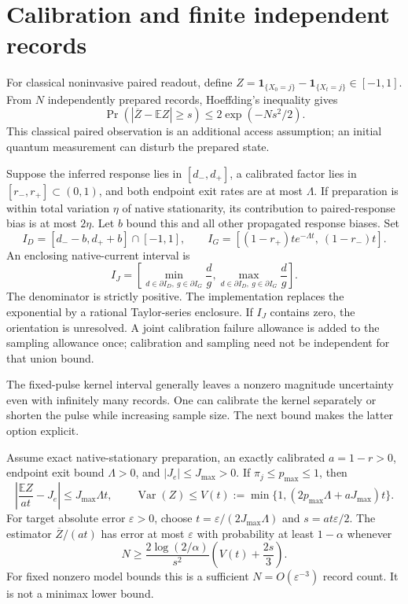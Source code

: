 \section{Calibration and finite independent records}

For classical noninvasive paired readout, define
$Z=\mathbf 1_{\{X_0=j\}}-\mathbf 1_{\{X_t=j\}}\in[-1,1]$.
From $N$ independently prepared records, Hoeffding's inequality gives
\[
 \Pr(|\overline Z-\mathbb EZ|\ge s)\le
           2\exp(-Ns^2/2).
\]
This classical paired observation is an additional access assumption;
an initial quantum measurement can disturb the prepared state.

Suppose the inferred response lies in $[d_-,d_+]$, a calibrated factor
lies in $[r_-,r_+]\subset(0,1)$, and both endpoint exit rates are at most
$\Lambda$.  If preparation is within total variation $\eta$ of native
stationarity, its contribution to paired-response bias is at most
$2\eta$.  Let $b$ bound this and all other propagated response biases.
Set
\[
 I_D=[d_--b,d_++b]\cap[-1,1],\qquad
 I_G=[(1-r_+)t e^{-\Lambda t},\ (1-r_-)t].
\]
An enclosing native-current interval is
\begin{equation}
 I_J=\left[
 \min_{d\in\partial I_D,\ g\in\partial I_G}\frac d g,
 \max_{d\in\partial I_D,\ g\in\partial I_G}\frac d g
 \right].\label{eq:physical-current-interval}
\end{equation}
The denominator is strictly positive.  The implementation replaces
the exponential by a rational Taylor-series enclosure.  If $I_J$
contains zero, the orientation is unresolved.  A joint calibration
failure allowance is added to the sampling allowance once; calibration
and sampling need not be independent for that union bound.

The fixed-pulse kernel interval generally leaves a nonzero magnitude
uncertainty even with infinitely many records.  One can calibrate the
kernel separately or shorten the pulse while increasing sample size.
The next bound makes the latter option explicit.

\begin{proposition}
\label{prop:physical-magnitude}
Assume exact native-stationary preparation, an exactly calibrated
$a=1-r>0$, endpoint exit bound $\Lambda>0$, and
$|J_e|\le J_{\max}>0$.  If $\pi_j\le p_{\max}\le1$, then
\[
 \left|\frac{\mathbb EZ}{at}-J_e\right|
 \le J_{\max}\Lambda t,\qquad
 \operatorname{Var}(Z)\le
 V(t):=\min\{1,(2p_{\max}\Lambda+aJ_{\max})t\}.
\]
For target absolute error $\varepsilon>0$, choose
$t=\varepsilon/(2J_{\max}\Lambda)$ and
$s=at\varepsilon/2$.  The estimator $\overline Z/(at)$ has error at
most $\varepsilon$ with probability at least $1-\alpha$ whenever
\[
 N\ge\frac{2\log(2/\alpha)}{s^2}
       \left(V(t)+\frac{2s}{3}\right).
\]
For fixed nonzero model bounds this is a sufficient
$N=O(\varepsilon^{-3})$ record count.  It is not a minimax lower bound.
\end{proposition}


